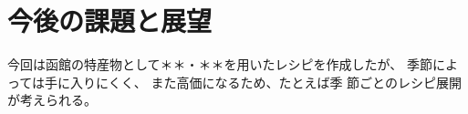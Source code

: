 \chapter{今後の課題と展望}

今回は函館の特産物として＊＊・＊＊を用いたレシピを作成したが、
季節によっては手に入りにくく、 また高価になるため、たとえば季
節ごとのレシピ展開が考えられる。 

